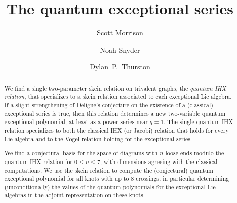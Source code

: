 \documentclass[12pt]{amsart}
\begin{document}
\title{The quantum exceptional series}

\author[Morrison]{Scott Morrison}
\address{Mathematical Sciences Institute, Australian National University}

\author[Snyder]{Noah Snyder}
\address{Bloomington, Indiana, USA}

\author[Thurston]{Dylan~P.~Thurston}
\address{Bloomington, Indiana, USA}

\begin{abstract}
  We find a single two-parameter skein relation on trivalent graphs,
  the \emph{quantum IHX relation}, that specializes to a skein
  relation associated to each exceptional Lie algebra. If a slight
  strengthening of Deligne's conjecture on the existence of a
  (classical) exceptional series is true, then this relation
  determines a new two-variable quantum exceptional polynomial, at
  least as a power series near $q=1$. The
  single quantum IHX relation specializes to both the classical IHX
  (or Jacobi) relation that holds for every Lie algebra and to the
  Vogel relation holding for the exceptional series.

  We find a conjectural basis for the space of diagrams with $n$ loose
  ends modulo the quantum IHX relation for $0 \le n \le 7$, with
  dimensions agreeing with the classical computations. We use the
  skein relation to compute the (conjectural) quantum exceptional
  polynomial for all knots with up to $8$ crossings, in particular
  determining (unconditionally) the values of the quantum polynomials
  for the exceptional Lie algebras in the adjoint representation on
  these knots.
\end{abstract}


\maketitle

\tableofcontents



\end{document}
